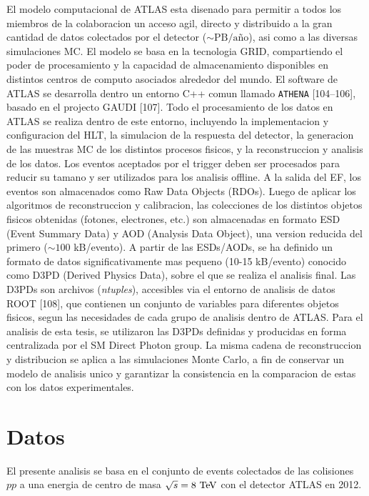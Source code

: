 El modelo computacional de ATLAS esta disenado para permitir a todos los miembros
de la colaboracion un acceso agil, directo y distribuido a la gran cantidad de datos
colectados por el detector ($\sim \text{PB}/\text{a\~no}$), asi como a las diversas
simulaciones MC. El modelo se basa en la tecnologia GRID, compartiendo el poder de
procesamiento y la capacidad de almacenamiento disponibles en distintos centros de
computo asociados alrededor del mundo.
El software de ATLAS se desarrolla dentro un entorno C++ comun llamado \texttt{ATHENA}
[104–106], basado en el projecto GAUDI [107]. Todo el procesamiento de los datos en
ATLAS se realiza dentro de este entorno, incluyendo la implementacion y configuracion
del HLT, la simulacion de la respuesta del detector, la generacion de las muestras MC de
los distintos procesos fisicos, y la reconstruccion y analisis de los datos.
Los eventos aceptados por el trigger deben ser procesados para reducir su tamano y
ser utilizados para los analisis offline. A la salida del EF, los eventos son almacenados
como Raw Data Objects (RDOs). Luego de aplicar los algoritmos de reconstruccion y
calibracion, las colecciones de los distintos objetos fisicos obtenidas (fotones, electrones,
etc.) son almacenadas en formato ESD (Event Summary Data) y AOD (Analysis Data
Object), una version reducida del primero ($\sim 100$ kB/evento). A partir de las ESDs/AODs,
se ha definido un formato de datos significativamente mas pequeno (10-15 kB/evento)
conocido como D3PD (Derived Physics Data), sobre el que se realiza el analisis final. Las
D3PDs son archivos (\emph{ntuples}), accesibles via el entorno de analisis de datos ROOT [108],
que contienen un conjunto de variables para diferentes objetos fisicos, segun las necesidades
de cada grupo de analisis dentro de ATLAS. Para el analisis de esta tesis, se utilizaron las
D3PDs definidas y producidas en forma centralizada por el SM Direct Photon group.
La misma cadena de reconstruccion y distribucion se aplica a las simulaciones Monte
Carlo, a fin de conservar un modelo de analisis unico y garantizar la consistencia en la
comparacion de estas con los datos experimentales.


\section{Datos}

El presente analisis se basa en el conjunto de events colectados de las colisiones $pp$
a una energia de centro de masa  $\sqrt{s} = 8\tev$ con el detector ATLAS en 2012.

